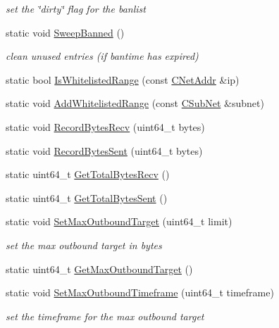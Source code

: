 \begin{DoxyCompactItemize}
\begin{DoxyCompactList}\small\item\em set the \char`\"{}dirty\char`\"{} flag for the banlist \end{DoxyCompactList}\item 
static void \mbox{\hyperlink{class_c_node_a2a65fc9928a735e79f7790f78a2eba02}{Sweep\+Banned}} ()
\begin{DoxyCompactList}\small\item\em clean unused entries (if bantime has expired) \end{DoxyCompactList}\item 
static bool \mbox{\hyperlink{class_c_node_ad2ccd5d22994f338c9b55ebe7528ea55}{Is\+Whitelisted\+Range}} (const \mbox{\hyperlink{class_c_net_addr}{C\+Net\+Addr}} \&ip)
\item 
static void \mbox{\hyperlink{class_c_node_ad2c1f955ec23851bd87a6bb144d85d03}{Add\+Whitelisted\+Range}} (const \mbox{\hyperlink{class_c_sub_net}{C\+Sub\+Net}} \&subnet)
\item 
static void \mbox{\hyperlink{class_c_node_af72b4b6e454c743af071896019ae1c69}{Record\+Bytes\+Recv}} (uint64\+\_\+t bytes)
\item 
static void \mbox{\hyperlink{class_c_node_a945c993a84eaa9d6bca18284befaccbe}{Record\+Bytes\+Sent}} (uint64\+\_\+t bytes)
\item 
static uint64\+\_\+t \mbox{\hyperlink{class_c_node_a1988b63b48fdc9b72014bdf9588b0168}{Get\+Total\+Bytes\+Recv}} ()
\item 
static uint64\+\_\+t \mbox{\hyperlink{class_c_node_af318a64e7ddad50d1e1b6fc123a5f0b9}{Get\+Total\+Bytes\+Sent}} ()
\item 
static void \mbox{\hyperlink{class_c_node_ad906c5639c15089c36c1f1e5820ef070}{Set\+Max\+Outbound\+Target}} (uint64\+\_\+t limit)
\begin{DoxyCompactList}\small\item\em set the max outbound target in bytes \end{DoxyCompactList}\item 
static uint64\+\_\+t \mbox{\hyperlink{class_c_node_a7f776273b0da9d6b904c3771659bf4f9}{Get\+Max\+Outbound\+Target}} ()
\item 
static void \mbox{\hyperlink{class_c_node_a5964ebb10e847c2f3c8066c9cb09263b}{Set\+Max\+Outbound\+Timeframe}} (uint64\+\_\+t timeframe)
\begin{DoxyCompactList}\small\item\em set the timeframe for the max outbound target \end{DoxyCompactList}\item 

\end{DoxyCompactItemize}

